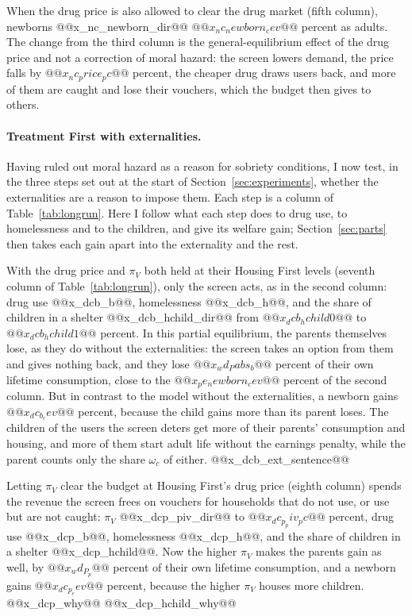 \documentclass[10pt]{article}
\begin{document}
When the drug price is also allowed to clear the drug market (fifth column), newborns @@x_nc_newborn_dir@@ $@@x_nc_newborn_cev@@$ percent as adults. The change from the third column is the general-equilibrium effect of the drug price and not a correction of moral hazard: the screen lowers demand, the price falls by $@@x_nc_price_pc@@$ percent, the cheaper drug draws users back, and more of them are caught and lose their vouchers, which the budget then gives to others.

\paragraph{Treatment First with externalities.} Having ruled out moral hazard as a reason for sobriety conditions, I now test, in the three steps set out at the start of Section~\ref{sec:experiments}, whether the externalities are a reason to impose them. Each step is a column of Table~\ref{tab:longrun}. Here I follow what each step does to drug use, to homelessness and to the children, and give its welfare gain; Section~\ref{sec:parts} then takes each gain apart into the externality and the rest.

With the drug price and $\pi_V$ both held at their Housing First levels (seventh column of Table~\ref{tab:longrun}), only the screen acts, as in the second column: drug use @@x_dcb_b@@, homelessness @@x_dcb_h@@, and the share of children in a shelter @@x_dcb_hchild_dir@@ from $@@x_dcb_hchild0@@$ to $@@x_dcb_hchild1@@$ percent. In this partial equilibrium, the parents themselves lose, as they do without the externalities: the screen takes an option from them and gives nothing back, and they lose $@@x_wd_Pabs_b@@$ percent of their own lifetime consumption, close to the $@@x_pe_newborn_cev@@$ percent of the second column. But in contrast to the model without the externalities, a newborn gains $@@x_dc_b_cev@@$ percent, because the child gains more than its parent loses. The children of the users the screen deters get more of their parents' consumption and housing, and more of them start adult life without the earnings penalty, while the parent counts only the share $\omega_c$ of either. @@x_dcb_ext_sentence@@

Letting $\pi_V$ clear the budget at Housing First's drug price (eighth column) spends the revenue the screen frees on vouchers for households that do not use, or use but are not caught: $\pi_V$ @@x_dcp_piv_dir@@ to $@@x_dc_p_piv_pc@@$ percent, drug use @@x_dcp_b@@, homelessness @@x_dcp_h@@, and the share of children in a shelter @@x_dcp_hchild@@. Now the higher $\pi_V$ makes the parents gain as well, by $@@x_wd_P_p@@$ percent of their own lifetime consumption, and a newborn gains $@@x_dc_p_cev@@$ percent, because the higher $\pi_V$ houses more children. @@x_dcp_why@@ @@x_dcp_hchild_why@@
\end{document}
